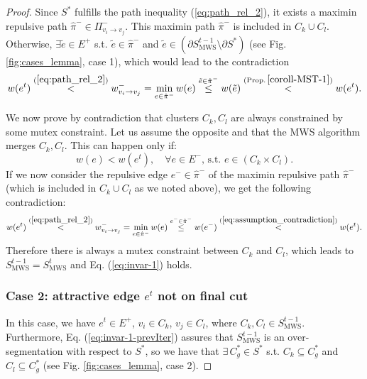 \begin{proof}
Since $S^{*}$ fulfills the path inequality (\ref{eq:path_rel_2}), it exists a maximin repulsive path $\hat{\pi}^{-}\in\Pi_{v_{i}\rightarrow v_{j}}^{-}$. 
This maximin path $\hat{\pi}^{-}$ is included in $C_{k}\cup C_{l}$. Otherwise, ${\exists \tilde{e}\in E^{+}}$ s.t. $\tilde{e}\in\hat{\pi}^{-}$ and $\tilde{e}\in\left(\partial S_{\mathrm{MWS}}^{t-1}\setminus\partial S^{*}\right)$  (see Fig. \ref{fig:cases_lemma}, case 1), which would lead to the contradiction \[
w(e^{t})\stackrel{(\ref{eq:path_rel_2})}{<}  w_{v_{i}\rightarrow v_{j}}^{-}=\min_{e\in\hat{\pi}^{-}}w(e)    \stackrel{\tilde{e}\in\hat{\pi}^{-}}{\leq} w(\tilde{e})\stackrel{(\mathrm{Prop.\,}\ref{coroll-MST-1})}{<}w(e^{t}).
\]

We now prove by contradiction that clusters $C_{k},C_{l}$ are always
constrained by some mutex constraint. Let us assume the opposite and
that the MWS algorithm merges $C_{k},C_{l}$. This can happen only if: 
\begin{equation}
w(e) < w(e^{t}),\quad\forall e\in E^{-},\,\mathrm{s.t.}\,\,e\in(C_{k}\times C_{l}).\label{eq:assumption_contradiction}
\end{equation}
If we now consider the repulsive edge $e^{-}\in\hat{\pi}^{-}$ of the maximin repulsive path $\hat{\pi}^{-}$ (which is included in $C_{k}\cup C_{l}$ as we noted above), we
get the following contradiction:
\[
w(e^{t}) \stackrel{(\ref{eq:path_rel_2})}{<}  w_{v_{i}\rightarrow v_{j}}^{-}=\min_{e\in\hat{\pi}^{-}}w(e)   \stackrel{e^-\in\hat{\pi}^{-}}{\leq} w(e^{-}) \stackrel{(\ref{eq:assumption_contradiction})}{<}  w(e^{t}).
\]
Therefore there is always a mutex constraint between $C_k$ and $C_l$, which leads to $S_{\mathrm{MWS}}^{t-1} = S_{\mathrm{MWS}}^{t}$ and Eq. (\ref{eq:invar-1}) holds.


\subsubsection*{Case 2: attractive edge $e^t$ not on final cut}
In this case, we have $e^{t}\in E^{+}$, $v_{i}\in C_{k}$,
$v_{j}\in C_{l}$, where $C_{k},C_{l}\in S_{\mathrm{MWS}}^{t-1}$. Furthermore, Eq. (\ref{eq:invar-1-prevIter}) assures that $S_{\mathrm{MWS}}^{t-1}$ is an over-segmentation with respect to $S^*$, so we have that $\exists \,C^*_g \in S^*$ s.t. $C_k \subseteq C^*_g$ and $C_l \subseteq C^*_g$ (see Fig. \ref{fig:cases_lemma}, case 2).  



\end{proof}
